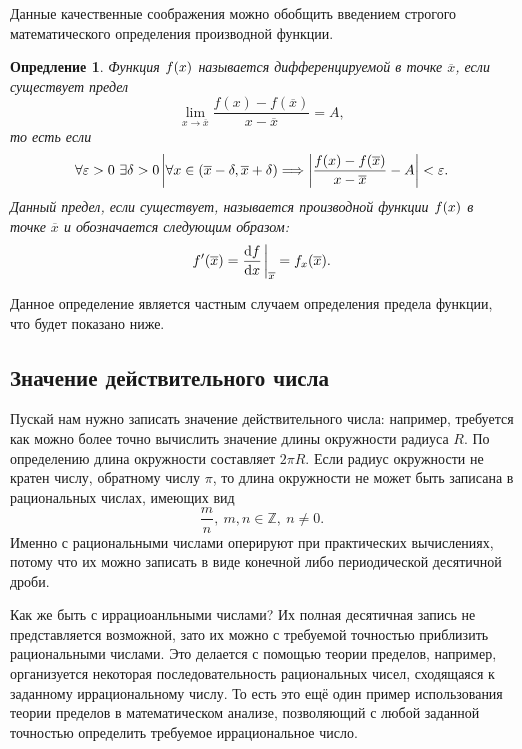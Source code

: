\documentclass[12pt]{article}
\newtheorem{definition}{Опредление}[section]
\begin{document}
Данные качественные соображения можно обобщить введением строгого математического определения производной функции.
\begin{definition}\label{def:13}
Функция $f\qty(x)$ называется дифференцируемой в точке $\overline{x}$, если существует предел 
\begin{equation}
    \lim_{x\rightarrow \overline{x}}{\dfrac{f(x) - f(\overline{x})}{ x-\overline{x}}} = A,
\end{equation}
то есть если 
\begin{equation}
    \forall \varepsilon > 0\ \exists \delta > 0\eval \forall x \in \qty(\overline{x} - \delta, \overline{x} + \delta) \Longrightarrow \abs{\dfrac{f(x) - f(\overline{x})}{ x-\overline{x}} - A} < \varepsilon.
\end{equation}
Данный предел, если существует, называется производной функции $f\qty(x)$ в точке $\overline{x}$ и обозначается следующим образом:
\begin{equation}
    f'\qty(\overline{x}) = \dv{f}{x}\eval_{\overline{x}} = f_x \qty(\overline{x}).
\end{equation}
\end{definition}
Данное определение является частным случаем определения предела функции, что будет показано ниже.

\subsection{Значение действительного числа}
Пускай нам нужно записать значение действительного числа: например, требуется как можно более точно вычислить значение длины окружности радиуса $R$. По определению длина окружности составляет $2\pi R$. Если радиус окружности не кратен числу, обратному числу $\pi$, то длина окружности не может быть записана в рациональных числах, имеющих вид 
\begin{equation}
    \dfrac{m}{n},\ m,n \in \mathbb{Z},\ n\ne 0.
\end{equation}
Именно с рациональными числами оперируют при практических вычислениях, потому что их можно записать в виде конечной либо периодической десятичной дроби. 
\par
Как же быть с иррациоанльными числами? Их полная десятичная запись не представляется возможной, зато их можно с требуемой точностью приблизить рациональными числами. Это делается с помощью теории пределов, например, организуется некоторая последовательность рациональных чисел, сходящаяся к заданному иррациональному числу. То есть это ещё один пример использования теории пределов в математическом анализе, позволяющий с любой заданной точностью определить требуемое иррациональное число.
\end{document}
